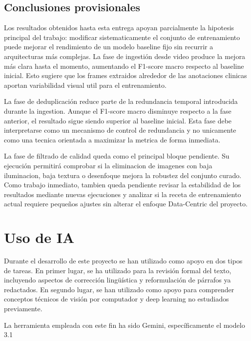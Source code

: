 ﻿\documentclass[10pt,a4paper,twocolumn,twoside]{article}
\begin{document}
\subsection{Conclusiones provisionales}

Los resultados obtenidos hasta esta entrega apoyan parcialmente la hipotesis principal del trabajo: modificar sistematicamente el conjunto de entrenamiento puede mejorar el rendimiento de un modelo baseline fijo sin recurrir a arquitecturas más complejas. La fase de ingestión desde video produce la mejora más clara hasta el momento, aumentando el F1-score macro respecto al baseline inicial. Esto sugiere que los frames extraidos alrededor de las anotaciones clinicas aportan variabilidad visual util para el entrenamiento.

La fase de deduplicación reduce parte de la redundancia temporal introducida durante la ingestion. Aunque el F1-score macro disminuye respecto a la fase anterior, el resultado sigue siendo superior al baseline inicial. Esta fase debe interpretarse como un mecanismo de control de redundancia y no unicamente como una tecnica orientada a maximizar la metrica de forma inmediata.

La fase de filtrado de calidad queda como el principal bloque pendiente. Su ejecución permitirá comprobar si la eliminacion de imagenes con baja iluminacion, baja textura o desenfoque mejora la robustez del conjunto curado. Como trabajo inmediato, tambien queda pendiente revisar la estabilidad de los resultados mediante nuevas ejecuciones y analizar si la receta de entrenamiento actual requiere pequeños ajustes sin alterar el enfoque Data-Centric del proyecto.

\section{Uso de IA}
Durante el desarrollo de este proyecto se han utilizado como apoyo en dos tipos de tareas. En primer lugar, se ha utilizado para la revisión formal del texto, incluyendo aspectos de corrección lingüística y reformulación de párrafos ya redactados. En segundo lugar, se han utilizado como apoyo para comprender conceptos técnicos de visión por computador y deep learning no estudiados previamente.

La herramienta empleada con este fin ha sido Gemini, específicamente el modelo 3.1\cite{google_gemini_2026}



\end{document}
